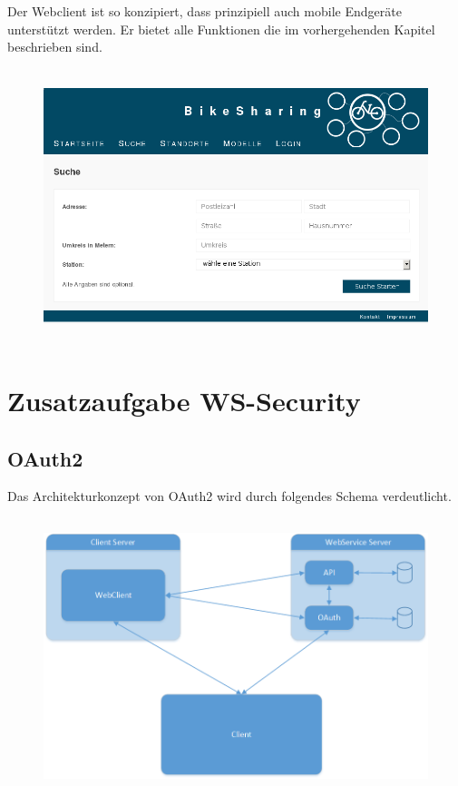 Der Webclient ist so konzipiert, dass prinzipiell auch mobile Endgeräte unterstützt werden.
Er bietet alle Funktionen die im vorhergehenden Kapitel beschrieben sind.

\begin{figure}
        \centering
	\includegraphics[height=80mm]{pics/bikesharing_search.png}
\end{figure}

\chapter{Zusatzaufgabe WS-Security}

\section{OAuth2}

Das Architekturkonzept von OAuth2 wird durch folgendes Schema verdeutlicht.

\begin{figure}
        \centering
	\includegraphics[height=80mm]{pics/Architektur.png}
\end{figure}

